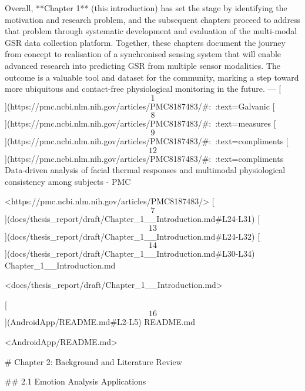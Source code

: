 \documentclass[12pt,a4paper]{article}
\begin{document}
Overall, **Chapter 1** (this introduction) has set the stage by
identifying the motivation and research problem, and the subsequent
chapters proceed to address that problem through systematic development
and evaluation of the multi-modal GSR data collection platform.
Together, these chapters document the journey from concept to
realisation of a synchronised sensing system that will enable advanced
research into predicting GSR from multiple sensor modalities. The
outcome is a valuable tool and dataset for the community, marking a step
toward more ubiquitous and contact-free physiological monitoring in the
future.
---
[\[1\]](https://pmc.ncbi.nlm.nih.gov/articles/PMC8187483/#:~:text=Galvanic%
[\[8\]](https://pmc.ncbi.nlm.nih.gov/articles/PMC8187483/#:~:text=measures%
[\[9\]](https://pmc.ncbi.nlm.nih.gov/articles/PMC8187483/#:~:text=compliments%
[\[12\]](https://pmc.ncbi.nlm.nih.gov/articles/PMC8187483/#:~:text=compliments%
Data-driven analysis of facial thermal responses and multimodal
physiological consistency among subjects - PMC

<https://pmc.ncbi.nlm.nih.gov/articles/PMC8187483/>
[\[7\]](docs/thesis_report/draft/Chapter_1__Introduction.md#L24-L31)
[\[13\]](docs/thesis_report/draft/Chapter_1__Introduction.md#L24-L32)
[\[14\]](docs/thesis_report/draft/Chapter_1__Introduction.md#L30-L34)
Chapter_1\_\_Introduction.md

<docs/thesis_report/draft/Chapter_1__Introduction.md>

[\[16\]](AndroidApp/README.md#L2-L5)
README.md

<AndroidApp/README.md>


\newpage


# Chapter 2: Background and Literature Review

## 2.1 Emotion Analysis Applications
\end{document}

